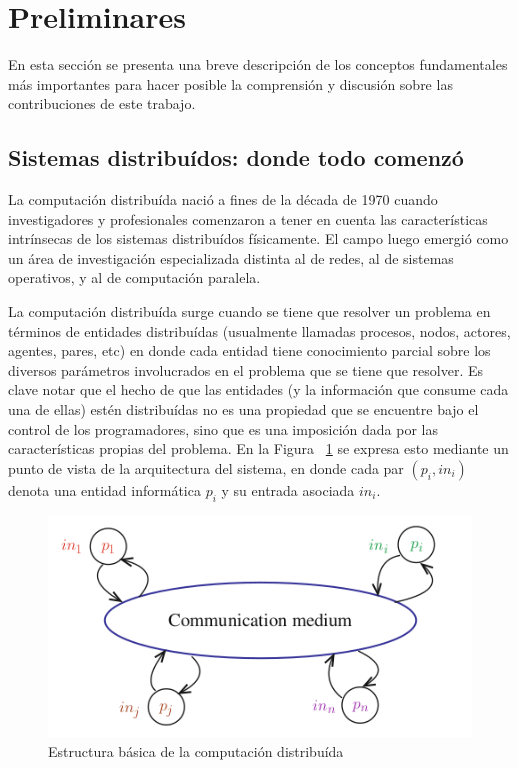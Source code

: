 \section{Preliminares}\label{sec:prelim}

En esta sección se presenta una breve descripción de los conceptos fundamentales
más importantes para hacer posible la comprensión y discusión sobre las
contribuciones de este trabajo.

\subsection{Sistemas distribuídos: donde todo comenzó}

La computación distribuída nació a fines de la década de 1970 cuando investigadores y profesionales
comenzaron a tener en cuenta las características intrínsecas de los sistemas distribuídos físicamente.
El campo luego emergió como un área de investigación especializada distinta al de redes, al de sistemas
operativos, y al de computación paralela.~\cite{raynal.dist.systems}

La computación distribuída surge cuando se tiene que resolver un problema en términos de entidades
distribuídas (usualmente llamadas procesos, nodos, actores, agentes, pares, etc) en donde cada
entidad tiene conocimiento parcial sobre los diversos parámetros involucrados en el problema que
se tiene que resolver. 
Es clave notar que el hecho de que las entidades (y la información que consume cada una de ellas)
estén distribuídas no es una propiedad que se encuentre bajo el control de los programadores, sino 
que es una imposición dada por las características propias del problema. En la 
Figura ~\ref{fig:distributed-systems} se expresa esto mediante un punto de vista
de la arquitectura del sistema, en donde cada par $(p_i, in_i)$ denota una entidad informática $p_i$ y su
entrada asociada $in_i$.

\begin{figure}
  \centering
  \includegraphics[scale=0.5]{figures/distributed-systems.png}
  \caption{Estructura básica de la computación distribuída}
  \label{fig:distributed-systems}
\end{figure}


